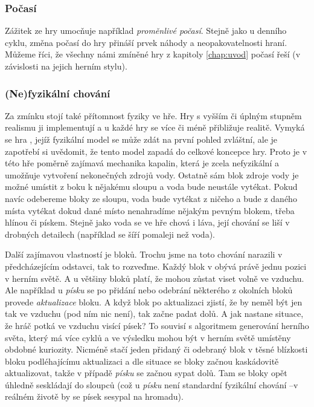 \subsubsection{Počasí}
Zážitek ze hry umocňuje například \textit{proměnlivé počasí}. Stejně jako u denního cyklu, změna počasí do hry přináší prvek náhody a neopakovatelnosti hraní. Můžeme říci, že všechny námi zmíněné hry z kapitoly \ref{chap:uvod} počasí řeší (v závislosti na jejich herním stylu). 

\subsubsection{(Ne)fyzikální chování}

Za zmínku stojí také přítomnost fyziky ve hře. Hry s vyšším či úplným stupněm realismu ji implementují a u každé hry se více či méně přibližuje realitě. Vymyká se hra \MC{}, jejíž fyzikální model se může zdát na první pohled zvláštní, ale je zapotřebí si uvědomit, že tento model zapadá do celkové koncepce hry. Proto je v této hře poměrně zajímavá mechanika kapalin, která je zcela nefyzikální a umožňuje vytvoření nekonečných zdrojů vody. Ostatně sám blok zdroje vody je možné umístit z boku k nějakému sloupu a voda bude neustále vytékat. Pokud navíc odebereme bloky ze sloupu, voda bude vytékat z ničeho a bude z daného místa vytékat dokud dané místo nenahradíme nějakým pevným blokem, třeba hlínou či pískem. Stejně jako voda se ve hře chová i láva, její chování se liší v drobných detailech (například se šíří pomaleji než voda).

Další zajímavou vlastností je  bloků. Trochu jsme na toto chování narazili v předcházejícím odstavci, tak to rozveďme. Každý blok v  obývá právě jednu pozici v herním světě. A u většiny bloků platí, že mohou zůstat viset volně ve vzduchu. Ale například u \textit{písku} se po přidání nebo odebrání některého z okolních bloků provede \textit{aktualizace} bloku. A když blok po aktualizaci zjistí, že by neměl být jen tak ve vzduchu (pod ním nic není), tak začne padat dolů. A jak nastane situace, že hráč potká ve vzduchu visící písek? To souvisí s algoritmem generování herního světa, který má více cyklů a ve výsledku mohou být v herním světě umístěny obdobné kuriozity. Nicméně stačí jeden přidaný či odebraný blok v těsné blízkosti bloku podléhajícímu aktualizaci a dle situace se bloky začnou kaskádovitě aktualizovat, takže v případě \textit{písku} se začnou sypat dolů. Tam se bloky opět úhledně seskládají do sloupců (což u \textit{písku} není standardní fyzikální chování --v reálném životě by se písek sesypal na hromadu).


